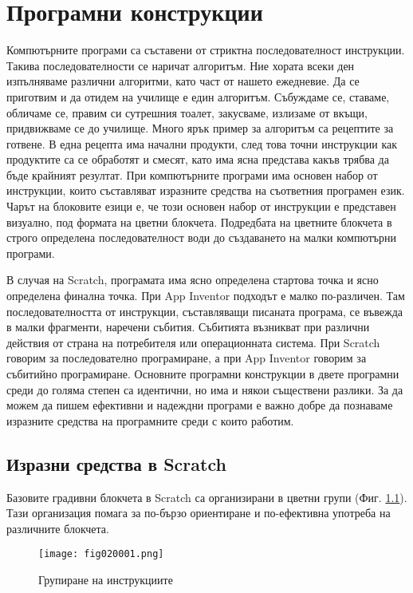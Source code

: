 \chapter{Програмни конструкции}

Компютърните програми са съставени от стриктна последователност инструкции. Такива последователности се наричат алгоритъм. Ние хората всеки ден изпълняваме различни алгоритми, като част от нашето ежедневие. Да се приготвим и да отидем на училище е един алгоритъм. Събуждаме се, ставаме, обличаме се, правим си сутрешния тоалет, закусваме, излизаме от вкъщи, придвижваме се до училище. Много ярък пример за алгоритъм са рецептите за готвене. В една рецепта има начални продукти, след това точни инструкции как продуктите са се обработят и смесят, като има ясна представа какъв трябва да бъде крайният резултат. При компютърните програми има основен набор от инструкции, които съставляват изразните средства на съответния програмен език. Чарът на блоковите езици е, че този основен набор от инструкции е представен визуално, под формата на цветни блокчета. Подредбата на цветните блокчета в строго определена последователност води до създаването на малки компютърни програми. 

В случая на Scratch, програмата има ясно определена стартова точка и ясно определена финална точка. При App Inventor подходът е малко по-различен. Там последователността от инструкции, съставляващи писаната програма, се въвежда в малки фрагменти, наречени събития. Събитията възникват при различни действия от страна на потребителя или операционната система. При Scratch говорим за последователно програмиране, а при App Inventor говорим за събитийно програмиране. Основните програмни конструкции в двете програмни среди до голяма степен са идентични, но има и някои съществени разлики. За да можем да пишем ефективни и надеждни програми е важно добре да познаваме изразните средства на програмните среди с които работим. 

\section{Изразни средства в Scratch}

Базовите градивни блокчета в Scratch са организирани в цветни групи (Фиг. \ref{fig020001}). Тази организация помага за по-бързо ориентиране и по-ефективна употреба на различните блокчета. 

\begin{figure}[H]
  \centering
  \texttt{[image: fig020001.png]}
  \caption{Групиране на инструкциите}
\label{fig020001}
\end{figure}

